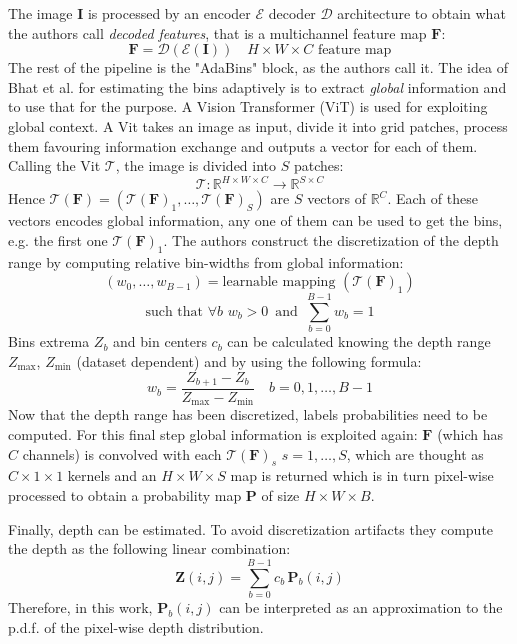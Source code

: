 The image $\mathbf{I}$ is processed by an encoder $\mathcal{E}$ decoder $\mathcal{D}$ architecture to obtain what the authors call \textit{decoded features}, that is a multichannel feature map $\mathbf{F}$:
\[
	\mathbf{F} = \mathcal{D}(\mathcal{E}(\mathbf{I})) \quad H \times W \times C \text{ feature map}
\]
The rest of the pipeline is the "AdaBins" block, as the authors call it.
The idea of Bhat et al. for estimating the bins adaptively is to extract \textit{global} information and to use that for the purpose.
A Vision Transformer (ViT) \cite{ViT} is used for exploiting global context.
A Vit takes an image as input, divide it into grid patches, process them favouring information exchange and outputs a vector for each of them. Calling the Vit $\mathcal{T}$, the image is divided into $S$ patches:
\[
	\mathcal{T}: \mathbb{R}^{H \times W \times C} \rightarrow \mathbb{R}^{S \times C}
\]
Hence $\mathcal{T}(\mathbf{F}) = (\mathcal{T}(\mathbf{F})_{1}, \dotsc, \mathcal{T}(\mathbf{F})_{S})$ are $S$ vectors of $\mathbb{R}^{C}$.
Each of these vectors encodes global information, any one of them can be used to get the bins, e.g. the first one $\mathcal{T}(\mathbf{F})_{1}$.
The authors construct the discretization of the depth range by computing relative bin-widths from global information:
\[
	(w_{0}, \dotsc, w_{B-1}) = \text{learnable mapping }(\mathcal{T}(\mathbf{F})_{1})
\]\[
	\text{such that } \forall b \,\, w_{b} > 0 \, \text{ and } \, \sum_{b=0}^{B-1} w_{b} = 1
\]
Bins extrema $Z_{b}$ and bin centers $c_{b}$ can be calculated knowing the depth range $Z_{\text{max}}$, $Z_{\text{min}}$ (dataset dependent) and by using the following formula:
\[
	w_{b} = \frac{Z_{b+1} - Z_{b}}{Z_{\text{max}} - Z_{\text{min}}} \quad b=0, 1, \dotsc, B-1
\]
Now that the depth range has been discretized, labels probabilities need to be computed.
For this final step global information is exploited again: $\mathbf{F}$ (which has $C$ channels) is convolved with each $\mathcal{T}(\mathbf{F})_{s}$ $s=1,\dotsc,S$, which are thought as $C \times 1 \times 1$ kernels and an $H \times W \times S$ map is returned which is in turn pixel-wise processed to obtain a probability map $\mathbf{P}$ of size $H \times W \times B$.

Finally, depth can be estimated.
To avoid discretization artifacts they compute the depth as the following linear combination:
\[
	\mathbf{Z}(i, j) = \sum_{b=0}^{B-1} c_{b} \, \mathbf{P}_{b}(i, j)
\]
Therefore, in this work, $\mathbf{P}_{b}(i, j)$ can be interpreted as an approximation to the p.d.f. of the pixel-wise depth distribution.

